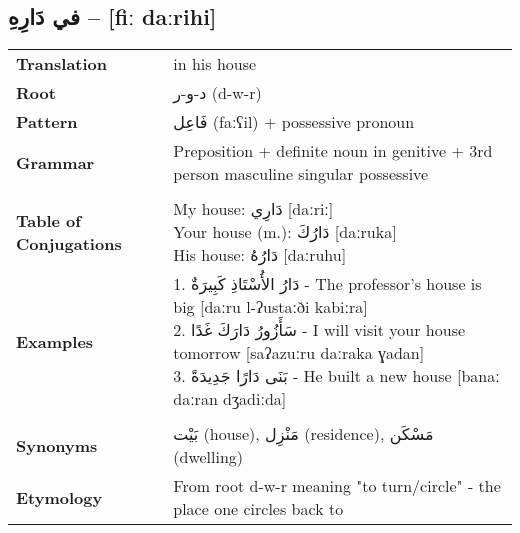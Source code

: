 \documentclass[letter,12pt]{article}
\begin{document}
\subsection{\textarabic{في دَارِهِ} – [fiː daːrihi]}
\begin{tabular}{p{3cm}p{10cm}}
\toprule
\textbf{Translation} & in his house \\
\textbf{Root} & \textarabic{د-و-ر} (d-w-r) \\
\textbf{Pattern} & \textarabic{فَاعِل} (faːʕil) + possessive pronoun \\
\textbf{Grammar} & Preposition + definite noun in genitive + 3rd person masculine singular possessive \\
\midrule \\
\textbf{Table of Conjugations} & \makecell[l]{
My house: \textarabic{دَارِي} [daːriː] \\
Your house (m.): \textarabic{دَارُكَ} [daːruka] \\
His house: \textarabic{دَارُهُ} [daːruhu]
} \\
\midrule
\textbf{Examples} & \makecell[l]{\parbox{9.5cm}{
1. \textarabic{دَارُ الأُسْتَاذِ كَبِيرَةٌ} - The professor's house is big [daːru l-ʔustaːði kabiːra]\\
2. \textarabic{سَأَزُورُ دَارَكَ غَدًا} - I will visit your house tomorrow [saʔazuːru daːraka ɣadan]\\
3. \textarabic{بَنَى دَارًا جَدِيدَةً} - He built a new house [banaː daːran dʒadiːda]
}} \\
\midrule \\
\textbf{Synonyms} & \textarabic{بَيْت} (house), \textarabic{مَنْزِل} (residence), \textarabic{مَسْكَن} (dwelling) \\
\textbf{Etymology} & From root d-w-r meaning "to turn/circle" - the place one circles back to \\
\bottomrule
\end{tabular}
\end{document}
